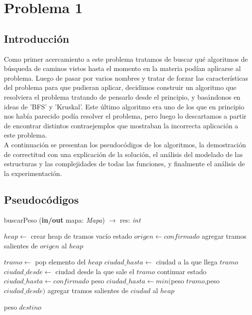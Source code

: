 \section{Problema 1}

\subsection{Introducción}

Como primer acercamiento a este problema tratamos de buscar qué algoritmos de búsqueda de caminos vistos hasta el momento en la materia podían aplicarse al problema. Luego de pasar por varios nombres y tratar de forzar las características del problema para que pudieran aplicar, decidimos construir un algoritmo que resolviera el problema tratando de pensarlo desde el principio, y basándonos en ideas de 'BFS' y 'Kruskal'. Este último algoritmo era uno de los que en principio nos había parecido podía resolver el problema, pero luego lo descartamos a partir de encontrar distintos contraejemplos que mostraban la incorrecta aplicación a este problema.\\
\indent A continuación se presentan los pseudocódigos de los algoritmos, la demostración de correctitud con una explicación de la solución, el análisis del modelado de las estructuras y las complejidades de todas las funciones, y finalmente el análisis de la experimentación.

\subsection{Pseudocódigos}

\begin{algorithm}
\caption{buscarPeso (\textbf{in/out} mapa: \textsl{Mapa}) $\rightarrow$ res: \textsl{int}}
\begin{algorithmic}[1]

\STATE $heap \leftarrow$ crear heap de tramos vacío
\STATE estado $origen \leftarrow confirmado$
\STATE agregar tramos salientes de $origen$ al $heap$

	\STATE $tramo \leftarrow$ pop elemento del $heap$
	\STATE $ciudad\_hasta \leftarrow$ ciudad a la que llega $tramo$
	\STATE $ciudad\_desde \leftarrow$ ciudad desde la que sale el $tramo$
		\STATE continuar
	\ENDIF
	\STATE estado $ciudad\_hasta \leftarrow confirmado$
	\STATE peso $ciudad\_hasta \leftarrow min($peso $tramo$,peso $ciudad\_desde)$
	\STATE agregar tramos salientes de $ciudad$ al $heap$
	
\ENDWHILE
\RETURN peso $destino$  
\end{algorithmic}
\end{algorithm}

